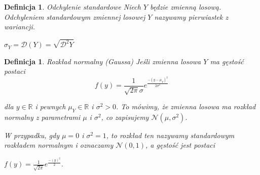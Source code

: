 \documentclass[12pt,a4paper]{report}
\newtheorem{definition}[theorem]{Definicja}
\begin{document}
\begin{definition}{Odchylenie standardowe \cite[Rozdział 5.6]{jakubowski2004}}
Niech $Y$ będzie zmienną losową. Odchyleniem standardowym zmiennej losowej $Y$ nazywamy pierwiastek z wariancji. 

$\sigma_Y=\mathcal{D}(Y)=\sqrt{\mathcal{D}^2Y}$

\end{definition}

\begin{definition}{Rozkład normalny (Gaussa) \cite[Rozdział 5.10]{jakubowski2004}}
Jeśli zmienna losowa $Y$ ma gęstość postaci
$$
f(y)=\frac{1}{\sqrt{2\pi}\sigma}e^\frac{-(y-\mu_Y)^2}{2\sigma^2}
$$ 

dla $y \in \mathbb{R}$ i pewnych $\mu_Y \in \mathbb{R}$ i $\sigma^2 >0$. To mówimy, że zmienna losowa ma rozkład normalny z parametrami $\mu$ i $\sigma^2$, co zapisujemy $\mathcal{N}(\mu, \sigma^2)$.


W przypadku, gdy $\mu=0$ i $\sigma^2=1$, to rozkład ten nazywamy standardowym rozkładem normalnym i oznaczamy $\mathcal{N}(0,1)$, a gęstość jest postaci

$f(y)=\frac{1}{\sqrt{2\pi}}e^\frac{-(y)^2}{2}.$ 

\end{definition}



\end{document}
